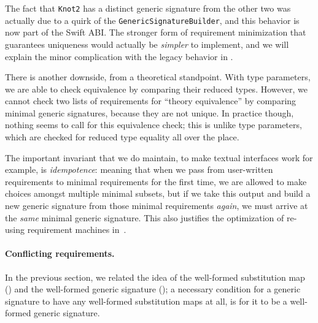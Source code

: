 \documentclass[../generics]{subfiles}
\begin{document}
The fact that \texttt{Knot2} has a distinct generic signature from the other two was actually due to a quirk of the \texttt{GenericSignatureBuilder}, and this behavior is now part of the Swift ABI. The stronger form of requirement minimization that guarantees uniqueness would actually be \emph{simpler} to implement, and we will explain the minor complication with the legacy behavior in .

There is another downside, from a theoretical standpoint. With type parameters, we are able to check equivalence by comparing their reduced types. However, we cannot check two lists of requirements for ``theory equivalence'' by comparing minimal generic signatures, because they are not unique. In practice though, nothing seems to call for this equivalence check; this is unlike type parameters, which are checked for reduced type equality all over the place.

The important invariant that we do maintain, to make textual interfaces work for example, is \emph{idempotence}: meaning that when we pass from user-written requirements to minimal requirements for the first time, we are allowed to make choices amongst multiple minimal subsets, but if we take this output and build a new generic signature from those minimal requirements \emph{again}, we must arrive at the \emph{same} minimal generic signature. This also justifies the optimization of re-using requirement machines in~.

\paragraph{Conflicting requirements.} In the previous section, we related the idea of the well-formed substitution map () and the well-formed generic signature (); a necessary condition for a generic signature to have any well-formed substitution maps at all, is for it to be a well-formed generic signature.
\end{document}
